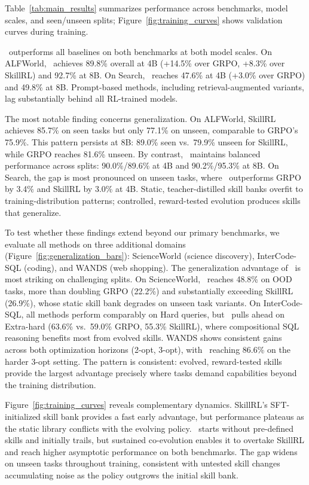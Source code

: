 \documentclass{article}
\theoremstyle{plain}
\theoremstyle{definition}
\theoremstyle{remark}
\begin{document}
Table~\ref{tab:main_results} summarizes performance across benchmarks, model scales, and seen/unseen splits; Figure~\ref{fig:training_curves} shows validation curves during training.

\ours~outperforms all baselines on both benchmarks at both model scales. On ALFWorld, \ours~achieves 89.8\% overall at 4B (+14.5\% over GRPO, +8.3\% over SkillRL) and 92.7\% at 8B. On Search, \ours~reaches 47.6\% at 4B (+3.0\% over GRPO) and 49.8\% at 8B. Prompt-based methods, including retrieval-augmented variants, lag substantially behind all RL-trained models.

The most notable finding concerns generalization. On ALFWorld, SkillRL achieves 85.7\% on seen tasks but only 77.1\% on unseen, comparable to GRPO's 75.9\%. This pattern persists at 8B: 89.0\% seen vs.\ 79.9\% unseen for SkillRL, while GRPO reaches 81.6\% unseen. By contrast, \ours~maintains balanced performance across splits: 90.0\%/89.6\% at 4B and 90.2\%/95.3\% at 8B. On Search, the gap is most pronounced on unseen tasks, where \ours~outperforms GRPO by 3.4\% and SkillRL by 3.0\% at 4B. Static, teacher-distilled skill banks overfit to training-distribution patterns; controlled, reward-tested evolution produces skills that generalize.

To test whether these findings extend beyond our primary benchmarks, we evaluate all methods on three additional domains (Figure~\ref{fig:generalization_bars}): ScienceWorld (science discovery), InterCode-SQL (coding), and WANDS (web shopping). The generalization advantage of \ours~is most striking on challenging splits. On ScienceWorld, \ours~reaches 48.8\% on OOD tasks, more than doubling GRPO (22.2\%) and substantially exceeding SkillRL (26.9\%), whose static skill bank degrades on unseen task variants. On InterCode-SQL, all methods perform comparably on Hard queries, but \ours~pulls ahead on Extra-hard (63.6\% vs.\ 59.0\% GRPO, 55.3\% SkillRL), where compositional SQL reasoning benefits most from evolved skills. WANDS shows consistent gains across both optimization horizons (2-opt, 3-opt), with \ours~reaching 86.6\% on the harder 3-opt setting. The pattern is consistent: evolved, reward-tested skills provide the largest advantage precisely where tasks demand capabilities beyond the training distribution.

Figure~\ref{fig:training_curves} reveals complementary dynamics. SkillRL's SFT-initialized skill bank provides a fast early advantage, but performance plateaus as the static library conflicts with the evolving policy. \ours~starts without pre-defined skills and initially trails, but sustained co-evolution enables it to overtake SkillRL and reach higher asymptotic performance on both benchmarks. The gap widens on unseen tasks throughout training, consistent with untested skill changes accumulating noise as the policy outgrows the initial skill bank.
\end{document}
